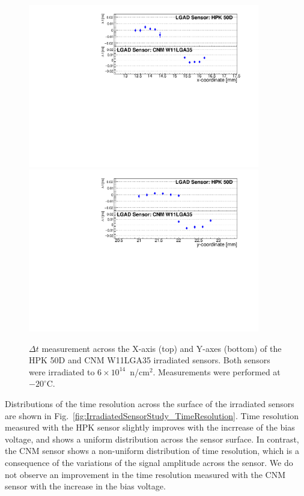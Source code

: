 \documentclass[preprint,1p]{elsarticle}
\begin{document}
\begin{figure}[htbp] 
\centering
\includegraphics[width=0.9\textwidth]{figs/USCSBoard_HPK50DIrradiated-CNMW11LGA35_Run936-961/IrradiatedSensorStudy_MeanTime_vs_X.pdf} 
\includegraphics[width=0.9\textwidth]{figs/USCSBoard_HPK50DIrradiated-CNMW11LGA35_Run936-961/IrradiatedSensorStudy_MeanTime_vs_Y.pdf} 
\caption{$\Delta{t}$ measurement across the X-axis (top) and Y-axes (bottom) of the HPK 50D and CNM W11LGA35 irradiated sensors. Both sensors were irradiated to $6\times 10^{14}$~n/cm$^2$. Measurements were performed at $-20^{\circ}$C.} 
\label{fig:IrradiatedSensorStudy_MeanTime} 
\end{figure} 

Distributions of the time resolution across the surface of the irradiated
sensors are shown in Fig.~\ref{fig:IrradiatedSensorStudy_TimeResolution}. Time
resolution measured with the HPK sensor slightly improves with the incrrease of
the bias voltage, and shows a uniform distribution across the sensor surface. In
contrast, the CNM sensor shows a non-uniform distribution of time resolution,
which is a consequence of the variations of the signal amplitude across the
sensor. We do not observe an improvement in the time resolution measured with
the CNM sensor with the increase in the bias voltage.
\end{document}
